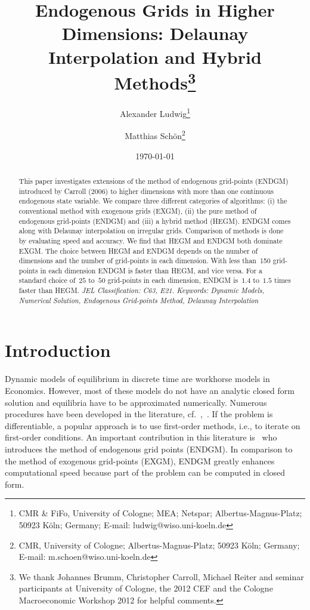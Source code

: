 \documentclass[a4paper,12pt]{article}
\begin{document}
\title{Endogenous Grids in Higher Dimensions: Delaunay Interpolation and Hybrid Methods\thanks{We thank Johannes Brumm, Christopher Carroll, Michael Reiter and seminar participants at University of Cologne, the 2012 CEF and the Cologne Macroeconomic Workshop 2012 for helpful comments.}}
\author{Alexander Ludwig\thanks{CMR \& FiFo, University of Cologne; MEA; Netspar; Albertus-Magnus-Platz; 50923 K\"oln; Germany; E-mail: ludwig@wiso.uni-koeln.de}
\and Matthias Sch\"{o}n\thanks{CMR, University of Cologne; Albertus-Magnus-Platz; 50923 K\"{o}ln; Germany; E-mail: m.schoen@wiso.uni-koeln.de}}
\date{\today}
\maketitle

\begin{abstract}
This paper investigates extensions of the method of endogenous grid-points (ENDGM) introduced by Carroll (2006) to higher dimensions with more than one continuous endogenous state variable. We compare three different categories of algorithms: (i) the conventional method with exogenous grids (EXGM), (ii) the pure method of endogenous grid-points (ENDGM) and (iii) a hybrid method (HEGM). ENDGM comes along with Delaunay interpolation on irregular grids. Comparison of methods is done by evaluating speed and accuracy. We find that HEGM and ENDGM both dominate EXGM. The choice between HEGM and ENDGM depends on the number of dimensions and the number of grid-points in each dimension. With less than~150 grid-points in each dimension ENDGM is faster than HEGM, and vice versa. For a standard choice of~$25$ to~$50$ grid-points in each dimension, ENDGM is~$1.4$ to~$1.5$ times faster than HEGM. 
\newline\textit{JEL Classification: C63, E21.
\newline Keywords: Dynamic Models, Numerical Solution, Endogenous Grid-points Method, Delaunay Interpolation}

\end{abstract}

\newpage
{} 
\renewcommand{\thefootnote}{\arabic{footnote}} 
\setcounter{footnote}{0}

\section{Introduction}

Dynamic models of equilibrium in discrete time are workhorse models in Economics. However, most of these models do not have an analytic closed form solution and equilibria have to be approximated numerically. Numerous procedures have been developed in the literature, cf.~,~. If the problem is differentiable, a popular approach is to use first-order methods, i.e., to iterate on first-order conditions. An important contribution in this literature is~ who introduces the method of endogenous grid points (ENDGM). In comparison to the method of exogenous grid-points (EXGM), ENDGM greatly enhances computational speed because part of the problem can be computed in closed form.
\end{document}
